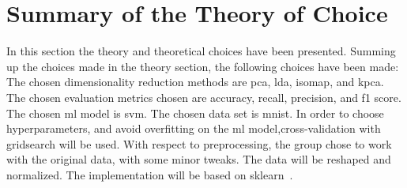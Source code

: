 \section{Summary of the Theory of Choice}\label{sec:theory-choice-summary}

In this section the theory and theoretical choices have been presented. Summing up the choices made in the theory section, the following choices have been made: The chosen dimensionality reduction methods are \gls{pca}, \gls{lda}, \gls{isomap}, and \gls{kpca}. The chosen evaluation metrics chosen are accuracy, recall, precision, and f1 score. The chosen \gls{ml} model is \gls{svm}. The chosen data set is \gls{mnist}. In order to choose hyperparameters, and avoid overfitting on the \gls{ml} model,cross-validation with gridsearch will be used. With respect to preprocessing, the group chose to work with the original data, with some minor tweaks. The data will be reshaped and normalized. The implementation will be based on \gls{sklearn}~\cite{scikit-learn}.